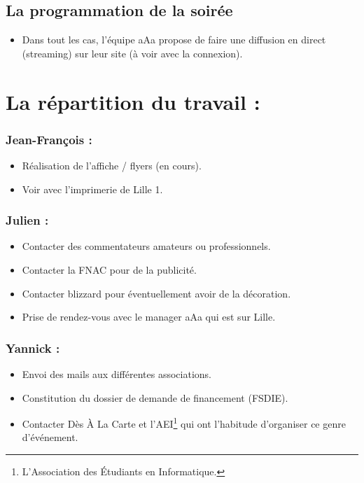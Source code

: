 \subsection{La programmation de la soirée}
\begin{itemize}
\item Dans tout les cas, l'équipe aAa propose de faire une diffusion en direct (streaming) sur leur site (à voir avec la connexion).
\end{itemize}

\section{La répartition du travail :}

\subsubsection{Jean-François :}
\begin{itemize}
\item Réalisation de l'affiche / flyers (en cours).
\item Voir avec l'imprimerie de Lille 1.
\end{itemize}

\subsubsection{Julien :}
\begin{itemize}
\item Contacter des commentateurs amateurs ou professionnels.
\item Contacter la FNAC pour de la publicité.
\item Contacter blizzard pour éventuellement avoir de la décoration.
\item Prise de rendez-vous avec le manager aAa qui est sur Lille.
\end{itemize}

\subsubsection{Yannick :}
\begin{itemize}
\item Envoi des mails aux différentes associations.
\item Constitution du dossier de demande de financement (FSDIE).
\item Contacter \og Dès À La Carte \fg{} et l'AEI\footnote{L'Association des Étudiants en Informatique.} qui ont l'habitude d'organiser ce genre d’événement.
\end{itemize}
